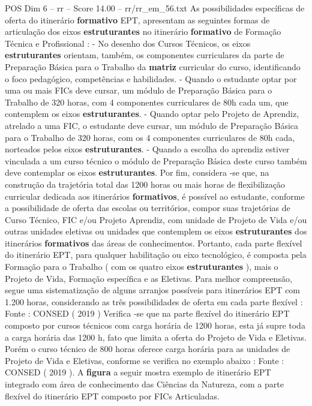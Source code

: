 \begin{textsample}{POS Dim 6 – rr – Score 14.00 – rr/rr\_em\_56.txt}
As possibilidades específicas de oferta do itinerário \textbf{formativo} EPT, apresentam as seguintes formas de articulação dos eixos \textbf{estruturantes} no itinerário \textbf{formativo} de Formação Técnica e Profissional : - No desenho dos Cursos Técnicos, os eixos \textbf{estruturantes} orientam, também, os componentes curriculares da parte de Preparação Básica para o Trabalho da \textbf{matriz} curricular do curso, identificando o foco pedagógico, competências e habilidades. - Quando o estudante optar por uma ou mais FICs deve cursar, um módulo de Preparação Básica para o Trabalho de 320 horas, com 4 componentes curriculares de 80h cada um, que contemplem os eixos \textbf{estruturantes}. - Quando optar pelo Projeto de Aprendiz, atrelado a uma FIC, o estudante deve cursar, um módulo de Preparação Básica para o Trabalho de 320 horas, com os 4 componentes curriculares de 80h cada, norteados pelos eixos \textbf{estruturantes}. - Quando a escolha do aprendiz estiver vinculada a um curso técnico o módulo de Preparação Básica deste curso também deve contemplar os eixos \textbf{estruturantes}.
Por fim, considera -se que, na construção da trajetória total das 1200 horas ou mais horas de flexibilização curricular dedicada aos itinerários \textbf{formativos}, é possível ao estudante, conforme a possibilidade de oferta das escolas ou territórios, compor suas trajetórias de Curso Técnico, FIC e/ou Projeto Aprendiz, com unidade de Projeto de Vida e/ou outras unidades eletivas ou unidades que contemplem os eixos \textbf{estruturantes} dos itinerários \textbf{formativos} das áreas de conhecimentos.
Portanto, cada parte flexível do itinerário EPT, para qualquer habilitação ou eixo tecnológico, é composta pela Formação para o Trabalho ( com os quatro eixos \textbf{estruturantes} ), mais o Projeto de Vida, Formação específica e as Eletivas.
Para melhor compreensão, segue uma sistematização de alguns arranjos possíveis para itinerários EPT com 1.200 horas, considerando as três possibilidades de oferta em cada parte flexível : Fonte : CONSED ( 2019 ) Verifica -se que na parte flexível do itinerário EPT composto por cursos técnicos com carga horária de 1200 horas, esta já supre toda a carga horária das 1200 h, fato que limita a oferta do Projeto de Vida e Eletivas.
Porém o curso técnico de 800 horas oferece carga horária para as unidades de Projeto de Vida e Eletivas, conforme se verifica no exemplo abaixo : Fonte : CONSED ( 2019 ).
A \textbf{figura} a seguir mostra exemplo de itinerário EPT integrado com área de conhecimento das Ciências da Natureza, com a parte flexível do itinerário EPT composto por FICs Articuladas.

\end{textsample}
